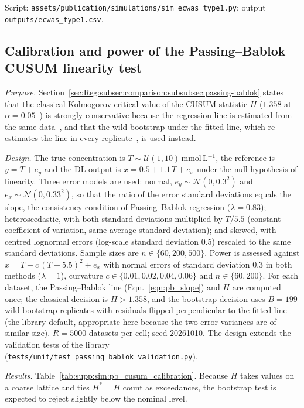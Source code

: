 \noindent Script: \texttt{assets/publication/simulations/sim\_ecwas\_type1.py}; output \texttt{outputs/ecwas\_type1.csv}.

\subsection{Calibration and power of the Passing--Bablok CUSUM linearity test}
\label{supp:sim:pb_cusum_calibration}

\textit{Purpose.} Section~\ref{sec:Reg:subsec:comparison:subsubsec:passing-bablok} states that the classical Kolmogorov critical value of the CUSUM statistic $H$ ($1.358$ at $\alpha = 0.05$~\cite{Passing1983}) is strongly conservative because the regression line is estimated from the same data~\cite{Durbin1973}, and that the wild bootstrap under the fitted line, which re-estimates the line in every replicate~\cite{Stute1998}, is used instead.

\textit{Design.} The true concentration is $T \sim \mathcal{U}(1, 10)$\,mmol\,L$^{-1}$, the reference is $y = T + e_y$ and the DL output is $x = 0.5 + 1.1\,T + e_x$ under the null hypothesis of linearity. Three error models are used: normal, $e_y \sim \mathcal{N}(0, 0.3^2)$ and $e_x \sim \mathcal{N}(0, 0.33^2)$, so that the ratio of the error standard deviations equals the slope, the consistency condition of Passing--Bablok regression ($\lambda = 0.83$); heteroscedastic, with both standard deviations multiplied by $T/5.5$ (constant coefficient of variation, same average standard deviation); and skewed, with centred lognormal errors (log-scale standard deviation $0.5$) rescaled to the same standard deviations. Sample sizes are $n \in \{60, 200, 500\}$. Power is assessed against $x = T + c\,(T - 5.5)^2 + e_x$ with normal errors of standard deviation $0.3$ in both methods ($\lambda = 1$), curvature $c \in \{0.01, 0.02, 0.04, 0.06\}$ and $n \in \{60, 200\}$. For each dataset, the Passing--Bablok line (Eqn.~\ref{eqn:pb_slope}) and $H$ are computed once; the classical decision is $H > 1.358$, and the bootstrap decision uses $B = 199$ wild-bootstrap replicates with residuals flipped perpendicular to the fitted line (the library default, appropriate here because the two error variances are of similar size). $R = 5000$ datasets per cell; seed 20261010. The design extends the validation tests of the library (\texttt{tests/unit/test\_passing\_bablok\_validation.py}).

\textit{Results.} Table~\ref{tab:supp:sim:pb_cusum_calibration}. %
Because $H$ takes values on a coarse lattice and ties $H^* = H$ count as exceedances, the bootstrap test is expected to reject slightly below the nominal level.

